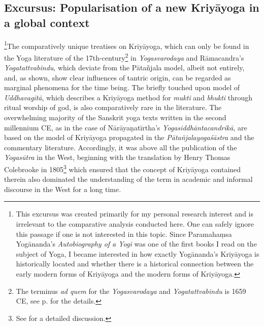 \subsection{Excursus: Popularisation of a new Kriyāyoga in a global context}
\label{excursus}
\footnote{This excursus was created primarily for my personal research interest and is irrelevant to the comparative analysis conducted here. One can safely ignore this passage if one is not interested in this topic. Since Paramahaṃsa Yogānanda's \textit{Autobiography of a Yogi} was one of the first books I read on the subject of Yoga, I became interested in how exactly Yogānanda's Kriyāyoga is historically located and whether there is a historical connection between the early modern forms of Kriyāyoga and the modern forms of Kriyāyoga.}The comparatively unique treatises on Kriyāyoga, which can only be found in the Yoga literature of the 17th-century\footnote{The terminus \textit{ad quem} for the \textit{Yogasvarodaya} and \textit{Yogatattvabindu} is 1659 CE, see p.\pageref{dating} for the details.} in \textit{Yogasvarodaya} and Rāmacandra's \textit{Yogatattvabindu}, which deviate from the Pātañjala model, albeit not entirely, and, as shown, show clear influences of tantric origin, can be regarded as marginal phenomena for the time being. The briefly touched upon model of \textit{Uddhavagītā}, which describes a Kriyāyoga method for \textit{mukti} and \textit{bhukti} through ritual worship of god, is also comparatively rare in the literature. The overwhelming majority of the Sanskrit yoga texts written in the second millennium CE, as in the case of Nārāyaṇatīrtha's \textit{Yogasiddhāntacandrikā}, are based on the model of Kriyāyoga propagated in the \textit{Pātañjalayogaśāstra} and the commentary literature. Accordingly, it was above all the publication of the \textit{Yogasūtra} in the West, beginning with the translation by Henry Thomas Colebrooke in 1805\footnote{See \cite{colebrooke2014} for a detailed discussion.} which ensured that the concept of Kriyāyoga contained therein also dominated the understanding of the term in academic and informal discourse in the West for a long time. 

